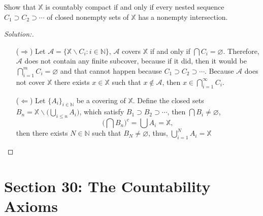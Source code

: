 \documentclass[a4paper,12pt, reqno]{article}
\theoremstyle{definition}
\newenvironment{exerr}[1]{
  \renewcommand\theexeralt{#1}
  \exeralt
}{\endexeralt}
\newenvironment{solution}{\begin{proof}[Solution:]}{\end{proof}}
\newcommand{\A}{\mathscr{A}}
\newcommand{\N}{\mathbb{N}}
\newcommand{\X}{\mathbb{X}}
\begin{document}
\begin{exerr}{5}
  Show that $\X$ is countably compact if and only if every nested sequence $C_{1}\supset C_{2}\supset\cdots$ of closed nonempty sets of $\X$ has a nonempty intersection.
\end{exerr}
\begin{solution}\hfill
  \begin{itemize}
    \item[($\Longrightarrow$)] Let $\A = \{ \X\backslash C_{i} : i\in\N \}$, $\A$ covers $\X$ if and only if $\bigcap C_{i} = \varnothing$. Therefore, $\A$ does not contain any finite subcover, because if it did, then it would be $\bigcap_{i=1}^m C_{i}= \varnothing$ and that cannot happen because $C_{1}\supset C_{2}\supset\cdots$. Because $\A$ does not cover $\X$ there exists $x\in\X$ such that $x\notin \A$, then $x\in\bigcap_{i=1}^\infty C_{i}$.
    \item[($\Longleftarrow$)] Let $\{ A_{i} \}_{i\in\N}$ be a covering of $\X$. Define the closed sets $B_{n} = \X\backslash \big( \bigcup_{i\leq n}A_{i} \big)$, which satisfy $B_{1}\supset B_{2}\supset\cdots$, then $\bigcap B_{i} \neq \varnothing$,
    \begin{equation*}
        \Big( \bigcap B_n \Big)^c = \bigcup A_{i} = \X,
    \end{equation*}
    then there exists $N\in\N$ such that $B_{N}\neq \varnothing$, thus, $\bigcup^N_{i=1} A_{i} = \X$
  \end{itemize}
\end{solution}

\section*{Section 30: The Countability Axioms}
\end{document}

